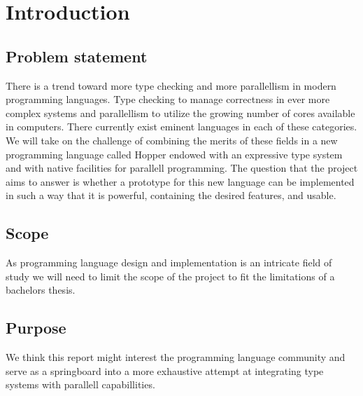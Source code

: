 \chapter{Introduction}



\section{Problem statement}

There is a trend toward more type checking and more parallellism in modern programming languages. Type checking to manage correctness in ever more complex systems and parallellism to utilize the growing number of cores available in computers. There currently exist eminent languages in each of these categories. We will take on the challenge of combining the merits of these fields in a new programming language called Hopper endowed with an expressive type system and with native facilities for parallell programming. The question that the project aims to answer is whether a prototype for this new language can be implemented in such a way that it is powerful, containing the desired features, and usable.

\section{Scope}

As programming language design and implementation is an intricate field of study we will need to limit the scope of the project to fit the limitations of a bachelors thesis. 

\section{Purpose}



We think this report might interest the programming language community and serve as a springboard into a more exhaustive attempt at integrating type systems with parallell capabillities.
